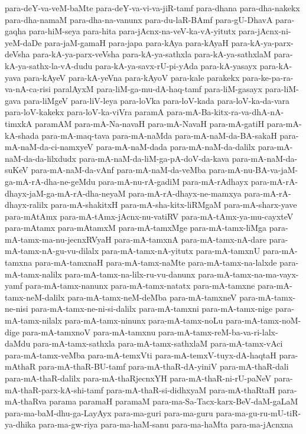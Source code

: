 {para-deY-va-veM-baMte
para-deY-va-vi-va-jiR-tamf
para-dhana
para-dha-nakekx
para-dha-namaM
para-dha-na-vanunx
para-du-laR-BAmf
para-gU-DhavA
para-gaqha
para-hiM-seya
para-hita
para-jAcnx-na-veV-ka-vA-yitutx
para-jAcnx-ni-yeM-daDe
para-jaM-gamaH
para-japa
para-kAya
para-kAyaH
para-kA-ya-parx-deVsha
para-kA-ya-parx-veVsha
para-kA-ya-sathxla
para-kA-ya-sathxlaM
para-kA-ya-sathx-la-vA-dudu
para-kA-ya-savx-rU-pi-yAda
para-kA-yasayx
para-kA-yava
para-kAyeV
para-kA-yeVna
para-kAyoV
para-kale
parakekx
para-ke-pa-ra-va-nA-ca-risi
paralAyxM
para-liM-ga-mu-dA-haq-tamf
para-liM-gasayx
para-liM-gava
para-liMgeV
para-liV-leya
para-loVka
para-loV-kada
para-loV-ka-da-vara
para-loV-kakekx
para-loV-ka-viVra
paramA
para-mA-Ba-kitx-ra-va-dhA-nA-timxkA
paramAM
para-mA-Na-navaH
para-mA-NavaH
para-mA-gatiH
para-mA-kA-shada
para-mA-maq-tava
para-mA-naMda
para-mA-naM-da-BA-sakaH
para-mA-naM-da-ci-namxyeV
para-mA-naM-dada
para-mA-naM-da-dalilx
para-mA-naM-da-da-lilxdudx
para-mA-naM-da-liM-ga-pA-doV-da-kava
para-mA-naM-da-suKeV
para-mA-naM-da-vAnf
para-mA-naM-da-veMba
para-mA-nu-BA-va-jaM-ga-mA-rA-dha-ne-geMdu
para-mA-nu-rA-gadiM
para-mA-rAdhayx
para-mA-rA-dhayx-jaM-ga-mA-rA-dha-neyaM
para-mA-rA-dhayx-ne-mamxya
para-mA-rA-dhayx-ralilx
para-mA-shakitxH
para-mA-sha-kitx-liRMgaM
para-mA-sharx-yave
para-mAtAmx
para-mA-tAmx-jAcnx-nu-vatiRV
para-mA-tAmx-ya-mu-cayxteV
para-mAtamx
para-mAtamxM
para-mA-tamxMge
para-mA-tamx-liMga
para-mA-tamx-ma-nu-jecnxRVyaH
para-mA-tamxnA
para-mA-tamx-nA-dare
para-mA-tamx-nA-gu-vu-dilalx
para-mA-tamx-nA-yitutx
para-mA-tamxnU
para-mA-tamxna
para-mA-tamxnaH
para-mA-tamx-naMte
para-mA-tamx-na-lalxde
para-mA-tamx-nalilx
para-mA-tamx-na-lilx-ru-vu-danunx
para-mA-tamx-na-ma-vayx-yamf
para-mA-tamx-nanunx
para-mA-tamx-natatx
para-mA-tamxne
para-mA-tamx-neM-dalilx
para-mA-tamx-neM-deMba
para-mA-tamxneV
para-mA-tamx-ne-nisi
para-mA-tamx-ne-ni-si-dalilx
para-mA-tamxni
para-mA-tamx-nige
para-mA-tamx-nilalx
para-mA-tamx-ninunx
para-mA-tamx-noLu
para-mA-tamx-noM-dige
para-mA-tamxnoV
para-mA-tamxnu
para-mA-tamx-reM-ba-va-ri-lalx-daMdu
para-mA-tamx-sathxla
para-mA-tamx-sathxlaM
para-mA-tamx-vAci
para-mA-tamx-veMba
para-mA-temxVti
para-mA-temxV-tuyx-dA-haqtaH
para-mAthaR
para-mA-thaR-BU-tamf
para-mA-thaR-dA-yiniV
para-mA-thaR-dali
para-mA-thaR-dalilx
para-mA-thaRjecnxYH
para-mA-thaR-ni-rU-paNeV
para-mA-thaR-parx-kA-shi-tamf
para-mA-thaR-si-didhxyaM
para-mA-thaRtaH
para-mA-thaRva
parama
paramaH
paramaM
para-ma-Sa-Tacx-karx-BeV-daM-gaLaM
para-ma-baM-dhu-ga-LayAyx
para-ma-guri
para-ma-guru
para-ma-gu-ru-mU-tiR-ya-dhika
para-ma-gw-riya
para-ma-haM-sanu
para-ma-haMta
para-ma-jAcnxna
}
